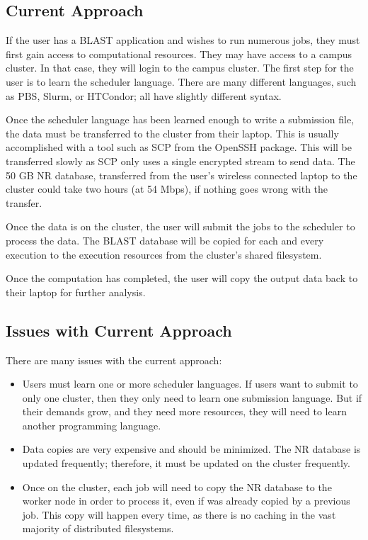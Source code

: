 \subsection{Current Approach}


If the user has a BLAST application and wishes to run numerous jobs, they must first gain access to computational resources.  They may have access to a campus cluster.  In that case, they will login to the campus cluster.  The first step for the user is to learn the scheduler language.  There are many different languages, such as PBS, Slurm, or HTCondor; all  have slightly different syntax.

Once the scheduler language has been learned enough to write a submission file, the data must be transferred to the cluster from their laptop.  This is usually accomplished with a tool such as SCP from the OpenSSH \cite{openssh} package.  This will be transferred slowly as SCP only uses a single encrypted stream to send data.  The 50 GB NR database, transferred from the user's wireless connected laptop to the cluster could take two hours (at 54 Mbps), if nothing goes wrong with the transfer.

Once the data is on the cluster, the user will submit the jobs to the scheduler to process the data.  The BLAST database will be copied for each and every execution to the execution resources from the cluster's shared filesystem.

Once the computation has completed, the user will copy the output data back to their laptop for further analysis.

\subsection{Issues with Current Approach}

There are many issues with the current approach:

\begin{itemize}
	\item Users must learn one or more scheduler languages.  If users want to submit to only one cluster, then they only need to learn one submission language.  But if their demands grow, and they need more resources, they will need to learn another programming language.
	\item Data copies are very expensive and should be minimized.  The NR database is updated frequently;  therefore, it must be updated on the cluster frequently.
	\item Once on the cluster, each job will need to copy the NR database to the worker node in order to process it, even if was already copied by a previous job.  This copy will happen every time, as there is no caching in the vast majority of distributed filesystems.
\end{itemize}







